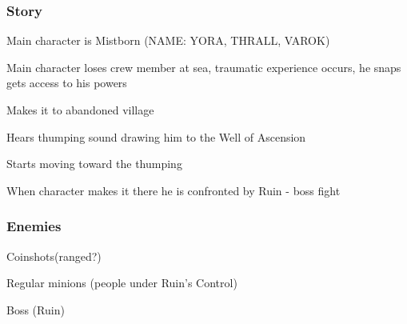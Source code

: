 \documentclass{article}
\begin{document}
\subsubsection{Story}
\begin{description}
\item Main character is Mistborn (NAME: YORA, THRALL, VAROK)
\item Main character loses crew member at sea, traumatic experience occurs, he snaps gets access to his powers
\item Makes it to abandoned village
\item Hears thumping sound drawing him to the Well of Ascension
\item Starts moving toward the thumping
\item When character makes it there he is confronted by Ruin - boss fight
\end{description}

\subsubsection{Enemies}
\begin{description}
\item Coinshots(ranged?)
\item Regular minions (people under Ruin’s Control)
\item Boss (Ruin)
\end{description}
\end{document}
